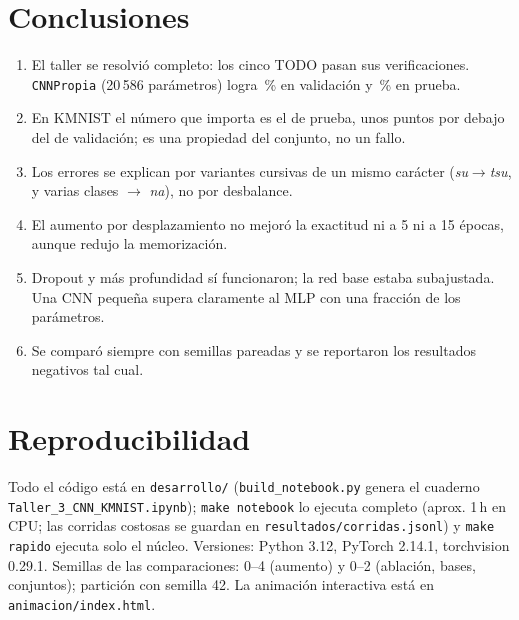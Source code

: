 \documentclass[11pt,letterpaper]{article}
\begin{document}
\section{Conclusiones}

\begin{enumerate}
  \item El taller se resolvió completo: los cinco TODO pasan sus verificaciones. \texttt{CNNPropia} (20\,586 parámetros) logra \cifraaccVal\,\% en validación y \cifraaccTest\,\% en prueba.
  \item En KMNIST el número que importa es el de prueba, unos \cifrabrechaValTest{} puntos por debajo del de validación; es una propiedad del conjunto, no un fallo.
  \item Los errores se explican por variantes cursivas de un mismo carácter (\textit{su}$\to$\textit{tsu}, y varias clases $\to$ \textit{na}), no por desbalance.
  \item El aumento por desplazamiento no mejoró la exactitud ni a 5 ni a 15 épocas, aunque redujo la memorización.
  \item Dropout y más profundidad sí funcionaron; la red base estaba subajustada. Una CNN pequeña supera claramente al MLP con una fracción de los parámetros.
  \item Se comparó siempre con semillas pareadas y se reportaron los resultados negativos tal cual.
\end{enumerate}

\section*{Reproducibilidad}
Todo el código está en \texttt{desarrollo/} (\texttt{build\_notebook.py} genera el cuaderno \texttt{Taller\_3\_CNN\_KMNIST\allowbreak.ipynb}); \texttt{make notebook} lo ejecuta completo (aprox. 1\,h en CPU; las corridas
costosas se guardan en \texttt{resultados/\allowbreak corridas.jsonl}) y \texttt{make rapido} ejecuta solo el núcleo. Versiones: Python 3.12, PyTorch 2.14.1, torchvision 0.29.1. Semillas
de las comparaciones: 0--4 (aumento) y 0--2 (ablación, bases, conjuntos); partición con semilla 42. La animación interactiva está en \texttt{animacion/index.html}.
\end{document}
